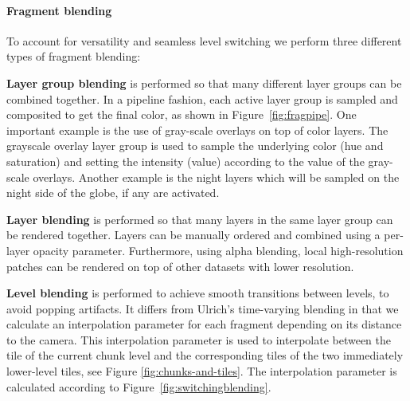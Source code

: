 \documentclass[journal]{vgtc}                %
\newcommand{\fig}[1]{Figure~\ref{fig:#1}}
\begin{document}
\paragraph{Fragment blending} \label{sec:fragment_blending}

To account for versatility and seamless level switching %
we perform three different types of fragment blending:

\noindent\textbf{Layer group blending} is performed so that many different layer groups can be combined together.
In a pipeline fashion, each active layer group is sampled and composited to get the final color, as shown in \fig{fragpipe}.
One important example is the use of gray-scale overlays on top of color layers.
The grayscale overlay layer group is used to sample the underlying color (hue and saturation) and setting the intensity (value) according to the value of the gray-scale overlays.
Another example is the night layers which will be sampled on the night side of the globe, if any are activated.

\noindent\textbf{Layer blending} is performed so that many layers in the same layer group can be rendered together. Layers can be manually ordered and combined using a per-layer opacity parameter. Furthermore, using alpha blending, local high-resolution patches can be rendered on top of other datasets with lower resolution.

\noindent\textbf{Level blending} is performed to achieve smooth transitions between levels, to avoid popping artifacts. It differs from Ulrich's time-varying blending \cite{ulrich2002rendering} in that
we calculate an interpolation parameter for each fragment depending on its distance to the camera.
This interpolation parameter is used to interpolate between the tile of the current chunk level and the corresponding tiles of the two immediately lower-level tiles, see Figure \ref{fig:chunks-and-tiles}. The interpolation parameter is calculated according to \fig{switchingblending}.
\end{document}
